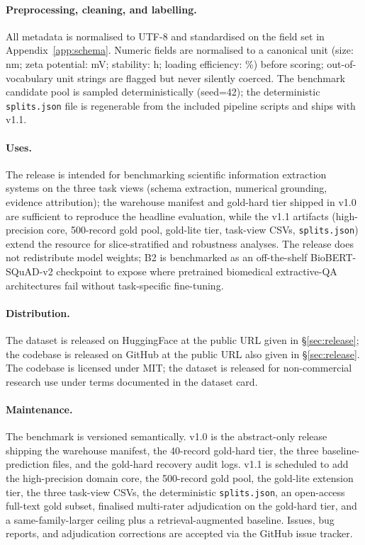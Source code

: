 \documentclass{article}
\begin{document}
\paragraph{Preprocessing, cleaning, and labelling.}
All metadata is normalised to UTF-8 and standardised on the field set
in Appendix~\ref{app:schema}. Numeric fields are normalised to a
canonical unit (size: nm; zeta potential: mV; stability: h; loading
efficiency: \%) before scoring; out-of-vocabulary unit strings are
flagged but never silently coerced. The benchmark candidate pool is
sampled deterministically (seed=42); the deterministic
\texttt{splits.json} file is regenerable from the included pipeline
scripts and ships with v1.1.

\paragraph{Uses.}
The release is intended for benchmarking scientific information
extraction systems on the three task views (schema extraction,
numerical grounding, evidence attribution); the warehouse manifest
and gold-hard tier shipped in v1.0 are sufficient to reproduce the
headline evaluation, while the v1.1 artifacts (high-precision core,
500-record gold pool, gold-lite tier, task-view CSVs,
\texttt{splits.json}) extend the resource for slice-stratified and
robustness analyses. The release does not redistribute model
weights; B2 is benchmarked as an off-the-shelf BioBERT-SQuAD-v2
checkpoint to expose where pretrained biomedical extractive-QA
architectures fail without task-specific fine-tuning.

\paragraph{Distribution.}
The dataset is released on HuggingFace at the public URL given in
\S\ref{sec:release}; the codebase is released on GitHub at the public
URL also given in \S\ref{sec:release}. The codebase is licensed under
MIT; the dataset is released for non-commercial research use under
terms documented in the dataset card.

\paragraph{Maintenance.}
The benchmark is versioned semantically. v1.0 is the abstract-only
release shipping the warehouse manifest, the 40-record gold-hard tier,
the three baseline-prediction files, and the gold-hard recovery audit
logs. v1.1 is scheduled to add the high-precision domain core, the
500-record gold pool, the gold-lite extension tier, the three
task-view CSVs, the deterministic \texttt{splits.json}, an
open-access full-text gold subset, finalised multi-rater adjudication
on the gold-hard tier, and a same-family-larger ceiling plus a
retrieval-augmented baseline. Issues, bug reports, and adjudication
corrections are accepted via the GitHub issue tracker.
\end{document}
